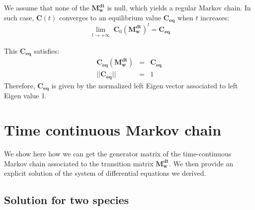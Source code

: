 We assume that none of the $\mathbf{M^{dt}_w}$ is null, which yields a regular Markov chain. In such case, $\mathbf{C}(t)$ converges to an equilibrium value $\mathbf{C_{eq}}$ when $t$ increases:
\begin{equation}
\lim\limits_{\substack{l \to +\infty }} \mathbf{C}_0(\mathbf{M^{dt}_w})^l=\mathbf{C_{eq}}
\end{equation}

This $\mathbf{C_{eq}}$ satisfies:
\begin{eqnarray}
\mathbf{C_{eq}}(\mathbf{M^{dt}_w}) &=& \mathbf{C_{eq}} \\
||\mathbf{C_{eq}}|| &=& 1
\end{eqnarray}
Therefore, $\mathbf{C_{eq}}$ is given by the normalized left Eigen vector associated to left Eigen value 1.



\section{Time continuous Markov chain}

We show here how we can get the generator matrix of the time-continuous Markov chain associated to the transition matrix $\mathbf{M^{dt}_w}$. We then provide an explicit solution of the system of differential equations we derived.


\subsection{Solution for two species}

